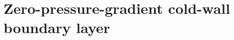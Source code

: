 \section{Zero-pressure-gradient cold-wall boundary layer}
\label{sec:comparative:zpg-cold-wall}






